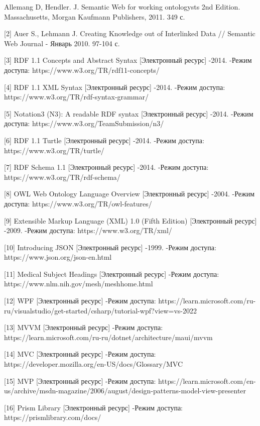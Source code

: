 \documentclass[12pt]{article}
\begin{document}
\begin{flushleft}
    [1] Allemang D, Hendler. J. Semantic Web for working ontologysts 2nd Edition. Massachusetts, Morgan Kaufmann Publishers, 2011. 349 с.

    [2] Auer S., Lehmann J. Creating Knowledge out of Interlinked Data // Semantic Web Journal - Январь 2010. 97-104 с.

    [3] RDF 1.1 Concepts and Abstract Syntax [Электронный ресурс] -2014. -Режим доступа: https://www.w3.org/TR/rdf11-concepts/

    [4] RDF 1.1 XML Syntax [Электронный ресурс] -2014. -Режим доступа: https://www.w3.org/TR/rdf-syntax-grammar/

    [5] Notation3 (N3): A readable RDF syntax [Электронный ресурс] -2014. -Режим доступа: https://www.w3.org/TeamSubmission/n3/

    [6] RDF 1.1 Turtle [Электронный ресурс] -2014. -Режим доступа: https://www.w3.org/TR/turtle/

    [7] RDF Schema 1.1 [Электронный ресурс] -2014. -Режим доступа: https://www.w3.org/TR/rdf-schema/

    [8] OWL Web Ontology Language Overview [Электронный ресурс] -2004. -Режим доступа: https://www.w3.org/TR/owl-features/

    [9] Extensible Markup Language (XML) 1.0 (Fifth Edition) [Электронный ресурс] -2009. -Режим доступа: https://www.w3.org/TR/xml/

    [10] Introducing JSON [Электронный ресурс] -1999. -Режим доступа: https://www.json.org/json-en.html

    [11] Medical Subject Headings [Электронный ресурс] -Режим доступа: https://www.nlm.nih.gov/mesh/meshhome.html

    [12] WPF [Электронный ресурс] -Режим доступа: https://learn.microsoft.com/ru-ru/visualstudio/get-started/csharp/tutorial-wpf?view=vs-2022

    [13] MVVM [Электронный ресурс] -Режим доступа: https://learn.microsoft.com/ru-ru/dotnet/architecture/maui/mvvm

    [14] MVC [Электронный ресурс] -Режим доступа: https://developer.mozilla.org/en-US/docs/Glossary/MVC

    [15] MVP [Электронный ресурс] -Режим доступа: https://learn.microsoft.com/en-us/archive/msdn-magazine/2006/august/design-patterns-model-view-presenter

    [16] Prism Library [Электронный ресурс] -Режим доступа: https://prismlibrary.com/docs/


\end{flushleft}
\end{document}
